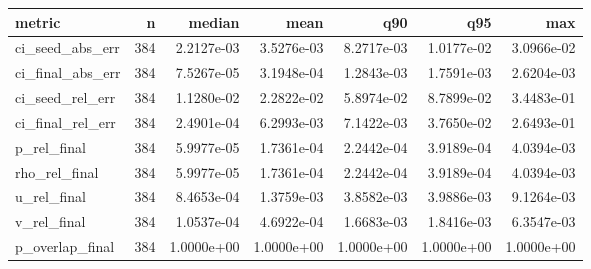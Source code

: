 \begin{tabular}{lrrrrrr}
\toprule
metric & n & median & mean & q90 & q95 & max \\
\midrule
ci_seed_abs_err & 384 & 2.2127e-03 & 3.5276e-03 & 8.2717e-03 & 1.0177e-02 & 3.0966e-02 \\
ci_final_abs_err & 384 & 7.5267e-05 & 3.1948e-04 & 1.2843e-03 & 1.7591e-03 & 2.6204e-03 \\
ci_seed_rel_err & 384 & 1.1280e-02 & 2.2822e-02 & 5.8974e-02 & 8.7899e-02 & 3.4483e-01 \\
ci_final_rel_err & 384 & 2.4901e-04 & 6.2993e-03 & 7.1422e-03 & 3.7650e-02 & 2.6493e-01 \\
p_rel_final & 384 & 5.9977e-05 & 1.7361e-04 & 2.2442e-04 & 3.9189e-04 & 4.0394e-03 \\
rho_rel_final & 384 & 5.9977e-05 & 1.7361e-04 & 2.2442e-04 & 3.9189e-04 & 4.0394e-03 \\
u_rel_final & 384 & 8.4653e-04 & 1.3759e-03 & 3.8582e-03 & 3.9886e-03 & 9.1264e-03 \\
v_rel_final & 384 & 1.0537e-04 & 4.6922e-04 & 1.6683e-03 & 1.8416e-03 & 6.3547e-03 \\
p_overlap_final & 384 & 1.0000e+00 & 1.0000e+00 & 1.0000e+00 & 1.0000e+00 & 1.0000e+00 \\
\bottomrule
\end{tabular}
